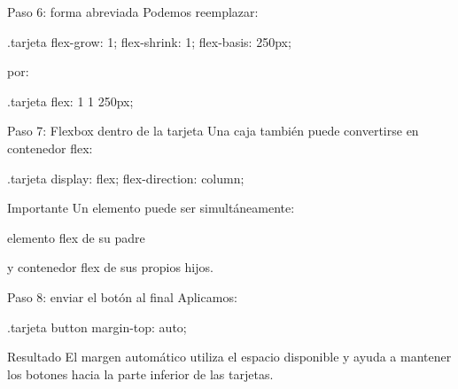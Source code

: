 \documentclass[aspectratio=169,11.5pt]{beamer}
\begin{document}
    \begin{frame}[fragile]{Paso 6: forma abreviada}
        Podemos reemplazar:

        \begin{csscodedark}
            .tarjeta {
                flex-grow: 1;
                flex-shrink: 1;
                flex-basis: 250px;
            }
        \end{csscodedark}

        por:

        \begin{csscodedark}
            .tarjeta {
                flex: 1 1 250px;
            }
        \end{csscodedark}
    \end{frame}

    \begin{frame}[fragile]{Paso 7: Flexbox dentro de la tarjeta}
        Una caja también puede convertirse
        en contenedor flex:

        \begin{csscodedark}
            .tarjeta {
                display: flex;
                flex-direction: column;
            }
        \end{csscodedark}

        \begin{block}{Importante}
            Un elemento puede ser simultáneamente:

            elemento flex de su padre

            y contenedor flex de sus propios hijos.
        \end{block}
    \end{frame}

    \begin{frame}[fragile]{Paso 8: enviar el botón al final}
        Aplicamos:

        \begin{csscodedark}
            .tarjeta button {
                margin-top: auto;
            }
        \end{csscodedark}

        \begin{block}{Resultado}
            El margen automático utiliza el espacio disponible
            y ayuda a mantener los botones hacia la parte inferior
            de las tarjetas.
        \end{block}
    \end{frame}
\end{document}
